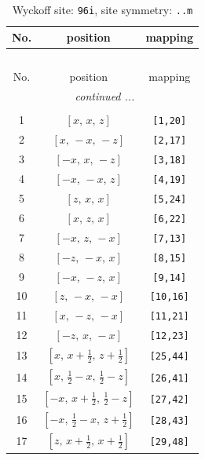 \documentclass[fleqn,8pt]{jsarticle}
\begin{document}
\begin{longtable}{ccc}
\caption{Wyckoff site: {\tt 96i}, site symmetry: {\tt ..m}}
 \\
 \hline \hline
No. & position & mapping \\ \hline \endfirsthead

\multicolumn{2}{l}{\tablename\ \thetable{}} \\
 \hline \hline
No. & position & mapping \\ \hline \endhead

 \hline \hline
\multicolumn{2}{r}{\footnotesize\it continued ...} \\ \endfoot

 \hline \hline
\multicolumn{2}{r}{} \\ \endlastfoot

1 & $\left[ x,\, x,\, z \right]$ & {\tt [1,20]} \\ \hline
2 & $\left[ x,\, - x,\, - z \right]$ & {\tt [2,17]} \\ \hline
3 & $\left[ - x,\, x,\, - z \right]$ & {\tt [3,18]} \\ \hline
4 & $\left[ - x,\, - x,\, z \right]$ & {\tt [4,19]} \\ \hline
5 & $\left[ z,\, x,\, x \right]$ & {\tt [5,24]} \\ \hline
6 & $\left[ x,\, z,\, x \right]$ & {\tt [6,22]} \\ \hline
7 & $\left[ - x,\, z,\, - x \right]$ & {\tt [7,13]} \\ \hline
8 & $\left[ - z,\, - x,\, x \right]$ & {\tt [8,15]} \\ \hline
9 & $\left[ - x,\, - z,\, x \right]$ & {\tt [9,14]} \\ \hline
10 & $\left[ z,\, - x,\, - x \right]$ & {\tt [10,16]} \\ \hline
11 & $\left[ x,\, - z,\, - x \right]$ & {\tt [11,21]} \\ \hline
12 & $\left[ - z,\, x,\, - x \right]$ & {\tt [12,23]} \\ \hline
13 & $\left[ x,\, x + \frac{1}{2},\, z + \frac{1}{2} \right]$ & {\tt [25,44]} \\ \hline
14 & $\left[ x,\, \frac{1}{2} - x,\, \frac{1}{2} - z \right]$ & {\tt [26,41]} \\ \hline
15 & $\left[ - x,\, x + \frac{1}{2},\, \frac{1}{2} - z \right]$ & {\tt [27,42]} \\ \hline
16 & $\left[ - x,\, \frac{1}{2} - x,\, z + \frac{1}{2} \right]$ & {\tt [28,43]} \\ \hline
17 & $\left[ z,\, x + \frac{1}{2},\, x + \frac{1}{2} \right]$ & {\tt [29,48]} \\ \hline

\end{longtable}
\end{document}
